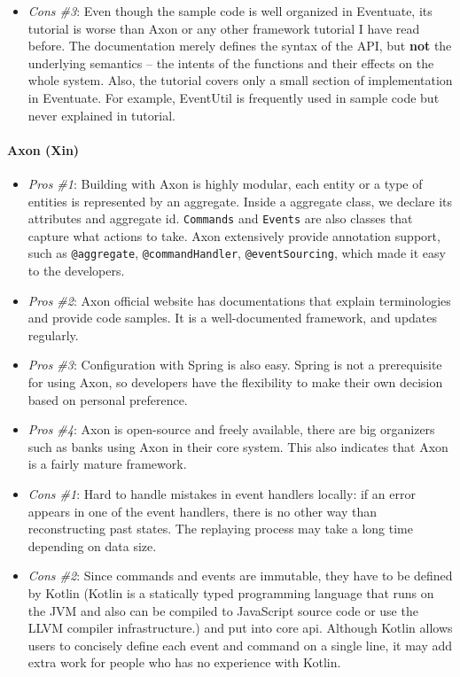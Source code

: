 \begin{itemize}
    \item \textit{Cons \#3}: Even though the sample code is well organized in Eventuate, its tutorial is worse than Axon or any other framework tutorial I have read before. The documentation merely defines the syntax of the API, but \textbf{not} the underlying semantics – the intents of the functions and their effects on the whole system. Also, the tutorial covers only a small section of implementation in Eventuate. For example, EventUtil is frequently used in sample code but never explained in tutorial.
\end{itemize}

\paragraph{Axon (Xin)}

\begin{itemize}
    \item \textit{Pros \#1}: Building with Axon is highly modular, each entity or a type of entities is represented by an aggregate. Inside a aggregate class, we declare its attributes and aggregate id. \texttt{Commands} and \texttt{Events} are also classes that capture what actions to take. Axon extensively provide annotation support, such as \texttt{@aggregate}, \texttt{@commandHandler}, \texttt{@eventSourcing}, which made it easy to the developers.
    \item \textit{Pros \#2}: Axon official website \cite{axon} has documentations that explain terminologies and provide code samples. It is a well-documented framework, and updates regularly.
    \item \textit{Pros \#3}: Configuration with Spring is also easy. Spring is not a prerequisite for using Axon, so developers have the flexibility to make their own decision based on personal preference.
    \item \textit{Pros \#4}: Axon is open-source and freely available, there are big organizers such as banks using Axon in their core system. This also indicates that Axon is a fairly mature framework.
    \item \textit{Cons \#1}: Hard to handle mistakes in event handlers locally: if an error appears in one of the event handlers, there is no other way than reconstructing past states. The replaying process may take a long time depending on data size.
    \item \textit{Cons \#2}: Since commands and events are immutable, they have to be defined by Kotlin (Kotlin is a statically typed programming language that runs on the JVM and also can be compiled to JavaScript source code or use the LLVM compiler infrastructure.) and put into core api. Although Kotlin allows users to concisely define each event and command on a single line, it may add extra work for people who has no experience with Kotlin.
\end{itemize}


